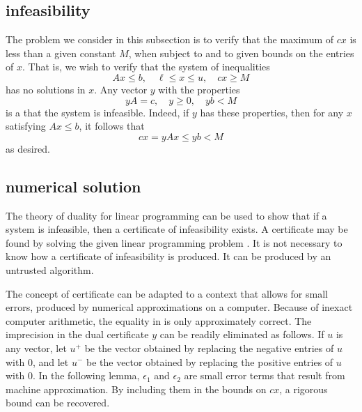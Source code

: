 \subsection{infeasibility}

The problem we consider in this subsection is to verify that the
maximum of $c x$ is less than a given constant $M$, when subject to
 and to given bounds on the entries of $x$.
That is, we wish to verify that the system of inequalities
\begin{equation}\label{eqn:empty}
A x \le b,\quad \ell \le x\le u,\quad c x \ge M
\end{equation}
has no solutions in $x$. Any vector $y$ with the properties
\begin{equation}\label{eqn:y}
  y A = c,\quad y\ge 0,\quad y b < M
\end{equation}
is a  that the system  is infeasible.  Indeed,
if $y$ has these properties, then for any $x$ satisfying
$A x \le b$, it follows that
\begin{equation}\label{eqn:cxM}
  c x = y A x \le y b < M
\end{equation}
as desired.


\subsection{numerical solution}


The theory of duality for linear programming can be used to show that if a
system is infeasible, then a certificate of infeasibility exists.  A certificate
may be found by solving the given linear programming problem .
It is not necessary to know how a
certificate of infeasibility is produced.  It can be produced 
by an untrusted algorithm.  

The concept of certificate can be
adapted to a context that allows for small  errors, produced by
numerical approximations on a computer.
Because of inexact computer arithmetic, the
equality in  is only  approximately correct. The imprecision in the
dual certificate $y$ can be readily eliminated as follows. If $u$ is any
vector, let $u^+$ be the vector obtained by replacing the negative
entries of $u$ with $0$, and let $u^-$ be the vector obtained by
replacing the positive entries of $u$ with $0$.  In the
following lemma, $\epsilon_1$ and $\epsilon_2$ are small error terms
that result from machine approximation. By including them in the
bounds on $c x$, a rigorous bound can be recovered.  


